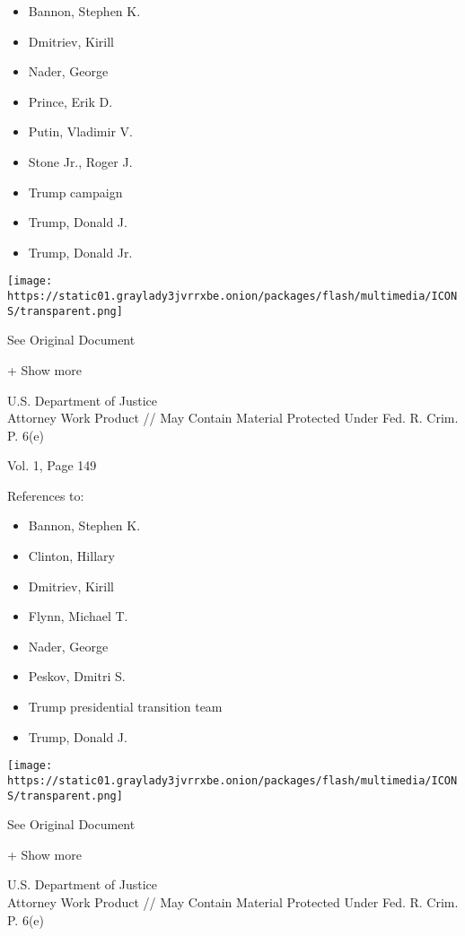 \begin{itemize}
\tightlist
\item
  Bannon, Stephen K.
\item
  Dmitriev, Kirill
\item
  Nader, George
\item
  Prince, Erik D.
\item
  Putin, Vladimir V.
\item
  Stone Jr., Roger J.
\item
  Trump campaign
\item
  Trump, Donald J.
\item
  Trump, Donald Jr.
\end{itemize}

\protect\hyperlink{}{}

\texttt{[image: https://static01.graylady3jvrrxbe.onion/packages/flash/multimedia/ICONS/transparent.png]}

See Original Document

+ Show more

U.S. Department of Justice\\
Attorney Work Product // May Contain Material Protected Under Fed. R.
Crim. P. 6(e)

Vol. 1, Page 149

References to:

\begin{itemize}
\tightlist
\item
  Bannon, Stephen K.
\item
  Clinton, Hillary
\item
  Dmitriev, Kirill
\item
  Flynn, Michael T.
\item
  Nader, George
\item
  Peskov, Dmitri S.
\item
  Trump presidential transition team
\item
  Trump, Donald J.
\end{itemize}

\protect\hyperlink{}{}

\texttt{[image: https://static01.graylady3jvrrxbe.onion/packages/flash/multimedia/ICONS/transparent.png]}

See Original Document

+ Show more

U.S. Department of Justice\\
Attorney Work Product // May Contain Material Protected Under Fed. R.
Crim. P. 6(e)


